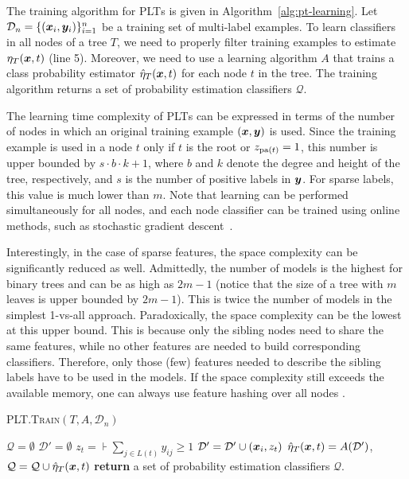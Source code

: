 \documentclass{article}
\newcommand{\cD}{\mathcal{D}}
\newcommand{\Algo}[1]{\textsc{#1}}
\begin{document}
The training algorithm for \Algo{PLT}s is given in Algorithm~\ref{alg:pt-learning}.
Let $\cD_n = \{ (\bx_i, \by_{i}) \}_{i=1}^n$ be a training set of multi-label examples.
To learn classifiers in all nodes of a tree $T$, we need to properly filter training examples to estimate $\eta_T(\boldsymbol{x},t)$ (line 5). Moreover, we need to use a learning algorithm $A$ that trains a class probability estimator $\hat{\eta}_T(\boldsymbol{x},t)$ for each node $t$ in the tree. %
The training algorithm returns a set of probability estimation classifiers $\mathcal{Q}$.

The learning time complexity of \Algo{PLT}s can be expressed in terms of the number of nodes in which an original training example $(\boldsymbol{x},\boldsymbol{y})$ is used. Since the training example is used in a node $t$ only if $t$ is the root or $z_{\mathrm{pa}(t)} = 1$, this number is upper bounded by $s\cdot b \cdot k+1$, where $b$ and $k$ denote the degree and height of the tree, respectively, and $s$ is the number of positive labels in $\boldsymbol{y}$. For sparse labels, this value is much lower than $m$. Note that learning can be performed simultaneously for all nodes, and each node classifier can be trained using online methods, such as stochastic gradient descent~\cite{Bottou_2010}.

Interestingly, in the case of sparse features, the space complexity can be significantly reduced as well. Admittedly, the number of models is the highest for binary trees and can be as high as $2m-1$ (notice that the size of a tree with $m$ leaves is upper bounded by $2m-1$). This is twice the number of models in the simplest 1-vs-all approach. Paradoxically, the space complexity can be the lowest at this upper bound. This is because only the sibling nodes need to share the same features, while no other features are needed to build corresponding classifiers. Therefore, only those (few) features needed to describe the sibling labels have to be used in the models. If the space complexity still exceeds the available memory, one can always use feature hashing over all nodes \cite{Weinberger_et_al_2009}.

%
\begin{algorithm}[t]
\caption{\Algo{PLT.Train}$(T, A, \cD_n)$}%
\label{alg:pt-learning}
\begin{algorithmic}[1]
\State $\mathcal{Q} = \emptyset$
\State $\cD' = \emptyset$
\State $z_t = \assert{\sum_{j \in L(t)} y_{ij} \ge 1 }$
\State $\cD' = \cD' \cup (\bx_i, z_t)$ 
\EndIf
\EndFor
\State $\heta_T(\bx,t) = A(\cD')$, $\mathcal{Q} = \mathcal{Q} \cup \hat{\eta}_T(\boldsymbol{x},t) $  
\EndFor
\State \textbf{return} a set of probability estimation classifiers $\mathcal{Q}$. 
\end{algorithmic}
\end{algorithm} 
\end{document}
